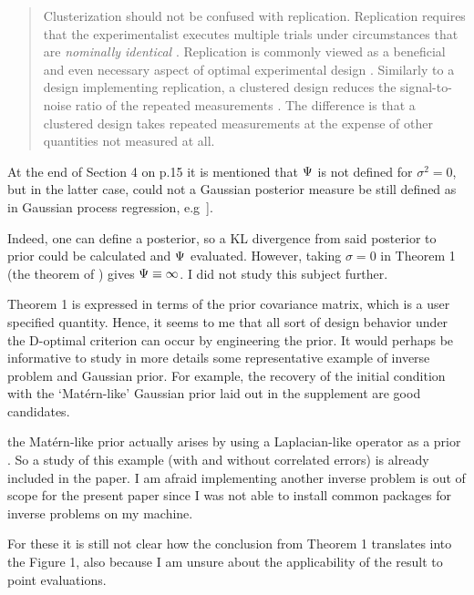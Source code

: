 \begin{quote}
  Clusterization should not be confused with replication. Replication
  requires that the experimentalist executes multiple trials under
  circumstances that are \emph{nominally identical} \cite[Section
    1.2.4]{morris2011}. Replication is commonly viewed as a beneficial
  and even necessary aspect of optimal experimental design
  \cite{fisher1949design, morris2011, schafer2001replication}. Similarly
  to a design implementing replication, a clustered design reduces the
  signal-to-noise ratio of the repeated measurements
  \cite{telford2007brief}. The difference is that a clustered design
  takes repeated measurements at the expense of other quantities not
  measured at all.
\end{quote}
  
  
\RC At the end of Section 4 on p.15 it is mentioned that $\Psi$ is not
defined for $\sigma^2= 0$, but in the latter case, could not a
Gaussian posterior measure be still defined as in Gaussian process
regression, e.g~\cite{rasmussen2006}].

\AR Indeed, one can define a posterior, so a KL divergence from said
posterior to prior could be calculated and $\Psi$ evaluated. However,
taking $\sigma = 0$ in Theorem 1 (the theorem of
\cite{AlexanderianGloorGhattas14}) gives $\Psi \equiv \infty$. I did
not study this subject further.

  
\RC Theorem 1 is expressed in terms of the prior covariance matrix,
which is a user specified quantity. Hence, it seems to me that all
sort of design behavior under the D-optimal criterion can occur by
engineering the prior. It would perhaps be informative to study in
more details some representative example of inverse problem and
Gaussian prior. For example, the recovery of the initial condition
with the ‘Mat\'ern-like’ Gaussian prior laid out in the supplement are
good candidates.

\AR the Mat\'ern-like prior actually arises by using a Laplacian-like
operator as a prior \cite{rue2011}. So a study of this example (with
and without correlated errors) is already included in the paper. I am
afraid implementing another inverse problem is out of scope for the
present paper since I was not able to install common packages for
inverse problems \cite{attia2023pyoed, VillaPetraGhattas16,
  VillaPetraGhattas18, VillaPetraGhattas21} on my machine.
  

\RC For these it is still not clear how the conclusion from Theorem 1
translates into the Figure 1, also because I am unsure about the
applicability of the result to point evaluations.

